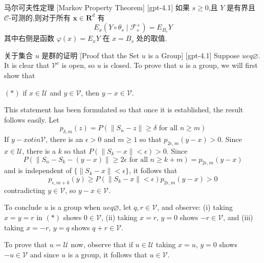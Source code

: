 \documentclass[UTF8]{ctexart}
\begin{document}
    
    
    \begin{thm}
        {马尔可夫性定理}
        [Markov Property Theorem]
        [gpt-4.1]
        如果 $s \geq 0$,且 $Y$ 是有界且 $\mathcal{C}$-可测的,则对于所有 $\boldsymbol{x} \in \mathbf{R}^d$ 有
\[
E_x (Y \circ \theta_s \mid \mathcal{F}_s^{+}) = E_{B_s} Y
\]
其中右侧是函数 $\varphi(x) = E_x Y$ 在 $x = B_s$ 处的取值.

    \end{thm}
    
    
    
    \begin{prf}
        {关于集合 $
    u$ 是群的证明}
        [Proof that the Set $
    u$ is a Group]
        [gpt-4.1]
        Suppose $
u 
eq \varnothing$.
It is clear that $\mathcal{V}^c$ is open, so $
u$ is closed.
To prove that $
u$ is a group, we will first show that

$(*)$ if $x \in \mathcal{U}$ and $y \in \mathcal{V}$, then $y - x \in \mathcal{V}$.

This statement has been formulated so that once it is established, the result follows easily.
Let
\[
p_{\delta, m}(z) = P(\| S_n - z \| \geq \delta \text{ for all } n \geq m)
\]
If $y - x 
otin \mathcal{V}$, there is an $\epsilon > 0$ and $m \geq 1$ so that $p_{2\epsilon, m}(y - x) > 0$.
Since $x \in \mathcal{U}$, there is a $k$ so that $P(\| S_k - x \| < \epsilon) > 0$.
Since
\[
P(\| S_n - S_k - (y - x) \| \geq 2\epsilon \text{ for all } n \geq k + m) = p_{2\epsilon, m}(y - x)
\]
and is independent of $\{ \| S_k - x \| < \epsilon \}$, it follows that
\[
p_{\epsilon, m + k}(y) \geq P(\| S_k - x \| < \epsilon) p_{2\epsilon, m}(y - x) > 0
\]
contradicting $y \in \mathcal{V}$, so $y - x \in \mathcal{V}$.

To conclude $
u$ is a group when $
u 
eq \varnothing$, let $q, r \in \mathcal{V}$, and observe: (i) taking $x = y = r$ in $(*)$ shows $0 \in \mathcal{V}$, (ii) taking $x = r$, $y = 0$ shows $-r \in \mathcal{V}$, and (iii) taking $x = -r$, $y = q$ shows $q + r \in \mathcal{V}$.

To prove that $
u = \mathcal{U}$ now, observe that if $u \in \mathcal{U}$ taking $x = u$, $y = 0$ shows $-u \in \mathcal{V}$ and since $
u$ is a group, it follows that $u \in \mathcal{V}$.

    \end{prf}
    
    
    
\end{document}
